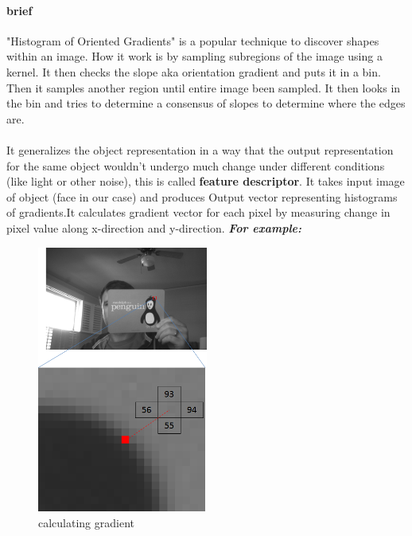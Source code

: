 \paragraph{brief}"Histogram of Oriented Gradients" is a popular technique to discover shapes within an image. How it work is by sampling subregions of the image using a kernel. It then checks the slope aka orientation gradient and puts it in a bin. Then it samples another region until entire image been sampled. It then looks in the bin and tries to determine a consensus of slopes to determine where the edges are.
\paragraph{}It generalizes the object representation in a way that the output representation for the same object wouldn’t undergo much change under different conditions (like light or other noise), this is called \textbf{feature descriptor}.
It takes input image of object (face in our case) and produces Output vector representing histograms of gradients.\newline It calculates gradient vector for each pixel by measuring change in pixel value along x-direction and y-direction. \newline \newline \textbf{\textit{For example:}}\newline
\begin{figure}
    \centering
	\includegraphics[width=0.5\textwidth]{images/hog_pixel_ex.png}
	\caption{calculating gradient}
	\label{fig:calculating gradient}
\end{figure}
